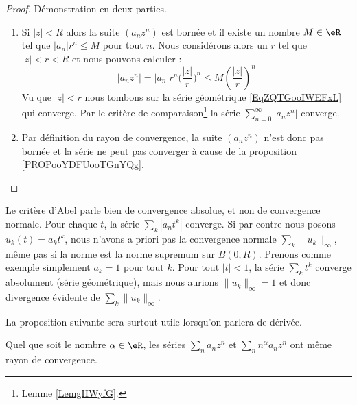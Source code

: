 \begin{proof}
    Démonstration en deux parties.
    \begin{enumerate}
        \item

            Si \( | z |<R\) alors la suite \( (a_nz^n)\) est bornée et il existe un nombre \( M\in \eR\) tel que \( | a_n |r^n\leq M\) pour tout \( n\). Nous considérons alors un \( r\) tel que \( | z |<r<R\) et nous pouvons calculer :
            \begin{equation}
                | a_nz^n |=| a_n |r^n\big( \frac{ | z | }{ r } \big)^n\leq M\left( \frac{ | z | }{ r } \right)^n
            \end{equation}
            Vu que \( | z |<r\) nous tombons sur la série géométrique \eqref{EqZQTGooIWEFxL} qui converge. Par le critère de comparaison\footnote{Lemme \ref{LemgHWyfG}.} la série \( \sum_{n=0}^{\infty}| a_nz^n |\) converge.

        \item
            Par définition du rayon de convergence, la suite \( (a_nz^n)\) n'est donc pas bornée et la série ne peut pas converger à cause de la proposition \ref{PROPooYDFUooTGnYQg}.
    \end{enumerate}
\end{proof}

Le critère d'Abel parle bien de convergence absolue, et non de convergence normale. Pour chaque \( t\), la série \( \sum_k | a_nt^k |\) converge. Si par contre nous posons \( u_k(t)=a_kt^k\), nous n'avons a priori pas la convergence normale \( \sum_k\| u_k \|_{\infty}\), même pas si la norme est la norme supremum sur \( B(0,R)\). Prenons comme exemple simplement \( a_k=1\) pour tout \( k\). Pour tout \( | t |<1\), la série \( \sum_k t^k\) converge absolument (série géométrique), mais nous aurions \( \| u_k \|_{\infty}=1\) et donc divergence évidente de \( \sum_k\| u_k \|_{\infty}\).

La proposition suivante sera surtout utile lorsqu'on parlera de dérivée.
\begin{proposition}        \label{PropHDIUooKTbVSX}
    Quel que soit le nombre \( \alpha\in \eR\), les séries \( \sum_na_nz^n\) et \( \sum_nn^{\alpha}a_nz^n\) ont même rayon de convergence.
\end{proposition}

